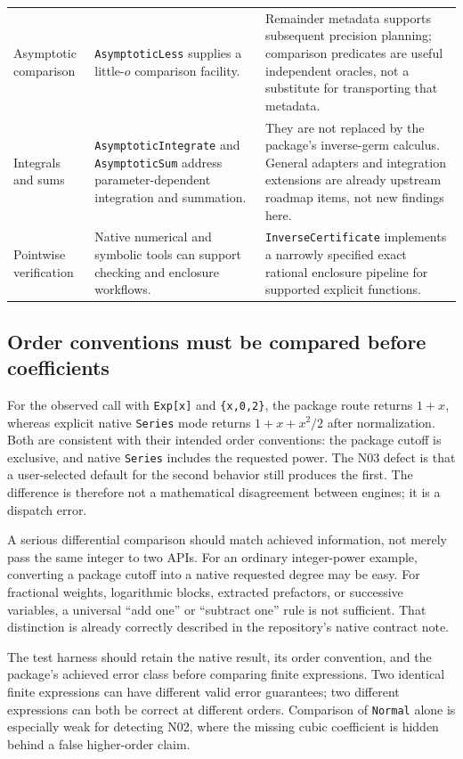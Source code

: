 \documentclass[11pt,letterpaper]{article}
\newcommand{\code}[1]{\nolinkurl{#1}}
\begin{document}
\begin{longtable}{@{}P{0.18\textwidth}P{0.37\textwidth}P{0.40\textwidth}@{}}
Asymptotic comparison & \code{AsymptoticLess} supplies a little-$o$ comparison facility. & Remainder metadata supports subsequent precision planning; comparison predicates are useful independent oracles, not a substitute for transporting that metadata.~\cite{wl-less,operations}\\
Integrals and sums & \code{AsymptoticIntegrate} and \code{AsymptoticSum} address parameter-dependent integration and summation. & They are not replaced by the package's inverse-germ calculus. General adapters and integration extensions are already upstream roadmap items, not new findings here.~\cite{wl-integrate,wl-sum,register}\\
Pointwise verification & Native numerical and symbolic tools can support checking and enclosure workflows. & \code{InverseCertificate} implements a narrowly specified exact rational enclosure pipeline for supported explicit functions.~\cite{certificates}\\
\bottomrule
\end{longtable}

\subsection{Order conventions must be compared before coefficients}
For the observed call with \code{Exp[x]} and \code{{x,0,2}}, the package route
returns $1+x$, whereas explicit native \code{Series} mode returns
$1+x+x^2/2$ after normalization. Both are consistent with their intended order
conventions: the package cutoff is exclusive, and native \code{Series} includes
the requested power. The N03 defect is that a user-selected default for the
second behavior still produces the first. The difference is therefore not a
mathematical disagreement between engines; it is a dispatch error.
\cite{nativecontracts,wl-series}

A serious differential comparison should match achieved information, not merely
pass the same integer to two APIs. For an ordinary integer-power example,
converting a package cutoff into a native requested degree may be easy. For
fractional weights, logarithmic blocks, extracted prefactors, or successive
variables, a universal ``add one'' or ``subtract one'' rule is not sufficient.
That distinction is already correctly described in the repository's native
contract note.~\cite{nativecontracts}

The test harness should retain the native result, its order convention, and
the package's achieved error class before comparing finite expressions. Two
identical finite expressions can have different valid error guarantees; two
different expressions can both be correct at different orders. Comparison of
\code{Normal} alone is especially weak for detecting N02, where the missing
cubic coefficient is hidden behind a false higher-order claim.
\end{document}
